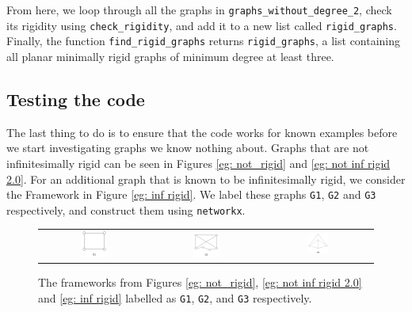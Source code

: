 \begin{flushleft}
From here, we loop through all the graphs in \texttt{graphs\_without\_degree\_2}, check its rigidity using \texttt{check\_rigidity}, and add it to a new list called \texttt{rigid\_graphs}. Finally, the function \texttt{find\_rigid\_graphs} returns \texttt{rigid\_graphs}, a list containing all planar minimally rigid graphs of minimum degree at least three.
\end{flushleft}

\subsection{Testing the code}

\begin{flushleft}
The last thing to do is to ensure that the code works for known examples before we start investigating graphs we know nothing about. Graphs that are not infinitesimally rigid can be seen in Figures \ref{eg: not_rigid} and \ref{eg: not inf rigid 2.0}. For an additional graph that is known to be infinitesimally rigid, we consider the Framework in Figure \ref{eg: inf rigid}. We label these graphs \texttt{G1}, \texttt{G2} and \texttt{G3} respectively, and construct them using \texttt{networkx}.
\end{flushleft}

\begin{figure}[htbp]
    \centering
    \begin{tabular}{c c c}
        \includegraphics[width = 0.25\textwidth]{Chapter 4/6. not_rigid.png} 
        & \includegraphics[width = 0.25\textwidth]{Chapter 4/7. not_inf_rigid_2.0.png} &
        \includegraphics[width=0.2\textwidth]{Chapter 4/8. inf_rigid.png}        
    \end{tabular}
    \caption{The frameworks from Figures \ref{eg: not_rigid}, \ref{eg: not inf rigid 2.0} and \ref{eg: inf rigid} labelled as \texttt{G1}, \texttt{G2}, and \texttt{G3} respectively.}
\end{figure}

